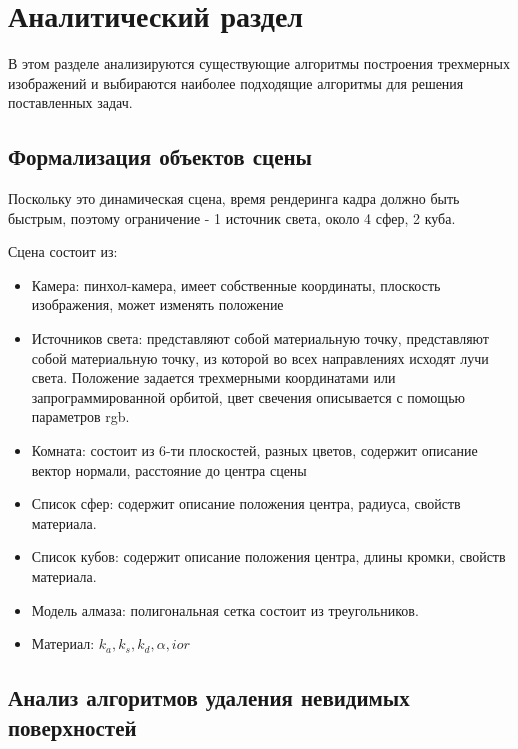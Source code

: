 \chapter{Аналитический раздел}
\label{cha:analysis}

В этом разделе анализируются существующие алгоритмы построения трехмерных изображений
и выбираются наиболее подходящие алгоритмы для решения поставленных задач.

\section{Формализация объектов сцены}


Поскольку это динамическая сцена, время рендеринга кадра должно быть быстрым,
поэтому ограничение - 1 источник света, около 4 сфер, 2 куба.

Сцена состоит из:

\begin{itemize}

  \item Камера: пинхол-камера, имеет собственные координаты, плоскость изображения, может изменять положение
  \item Источников света: представляют собой материальную точку,
  представляют собой материальную точку, из которой во всех направлениях исходят лучи света.
  Положение задается трехмерными координатами или запрограммированной орбитой,
  цвет свечения описывается с помощью параметров rgb.
  \item Комната: состоит из 6-ти плоскостей, разных цветов, содержит описание вектор нормали, расстояние до центра сцены
  \item Список сфер: содержит описание положения центра, радиуса, свойств материала.
  \item Список кубов: содержит описание положения центра, длины кромки, свойств материала.
  \item Модель алмаза: полигональная сетка состоит из треугольников.
  \item Материал: $k_a, k_s, k_d, \alpha, ior$
\end{itemize}



\section{Анализ алгоритмов удаления невидимых поверхностей}

